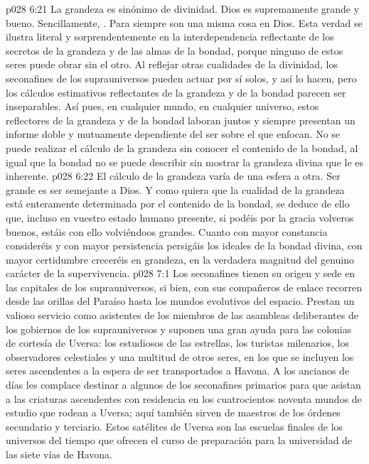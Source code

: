 \vs p028 6:21 La grandeza es sinónimo de divinidad. Dios es supremamente grande y bueno. Sencillamente, . Para siempre son una misma cosa en Dios. Esta verdad se ilustra literal y sorprendentemente en la interdependencia reflectante de los secretos de la grandeza y de las almas de la bondad, porque ninguno de estos seres puede obrar sin el otro. Al reflejar otras cualidades de la divinidad, los seconafines de los suprauniversos pueden actuar por sí solos, y así lo hacen, pero los cálculos estimativos reflectantes de la grandeza y de la bondad parecen ser inseparables. Así pues, en cualquier mundo, en cualquier universo, estos reflectores de la grandeza y de la bondad laboran juntos y siempre presentan un informe doble y mutuamente dependiente del ser sobre el que enfocan. No se puede realizar el cálculo de la grandeza sin conocer el contenido de la bondad, al igual que la bondad no se puede describir sin mostrar la grandeza divina que le es inherente.
\vs p028 6:22 El cálculo de la grandeza varía de una esfera a otra. Ser grande es ser semejante a Dios. Y como quiera que la cualidad de la grandeza está enteramente determinada por el contenido de la bondad, se deduce de ello que, incluso en vuestro estado humano presente, si podéis por la gracia volveros buenos, estáis con ello volviéndoos grandes. Cuanto con mayor constancia consideréis y con mayor persistencia persigáis los ideales de la bondad divina, con mayor certidumbre creceréis en grandeza, en la verdadera magnitud del genuino carácter de la supervivencia.
\vs p028 7:1 Los seconafines tienen su origen y sede en las capitales de los suprauniversos, si bien, con sus compañeros de enlace recorren desde las orillas del Paraíso hasta los mundos evolutivos del espacio. Prestan un valioso servicio como asistentes de los miembros de las asambleas deliberantes de los gobiernos de los suprauniversos y suponen una gran ayuda para las colonias de cortesía de Uversa: los estudiosos de las estrellas, los turistas milenarios, los observadores celestiales y una multitud de otros seres, en los que se incluyen los seres ascendentes a la espera de ser transportados a Havona. A los ancianos de días les complace destinar a algunos de los seconafines primarios para que asistan a las criaturas ascendentes con residencia en los cuatrocientos noventa mundos de estudio que rodean a Uversa; aquí también sirven de maestros de los órdenes secundario y terciario. Estos satélites de Uversa son las escuelas finales de los universos del tiempo que ofrecen el curso de preparación para la universidad de las siete vías de Havona.
